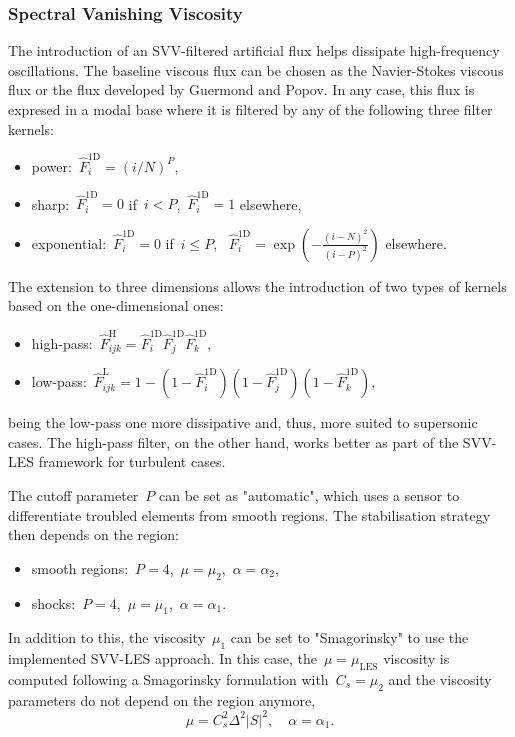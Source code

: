 \documentclass[a4paper,10pt]{report}
\begin{document}
\subsubsection{Spectral Vanishing Viscosity}

The introduction of an SVV-filtered artificial flux helps dissipate high-frequency oscillations. The baseline viscous flux can be chosen as the Navier-Stokes viscous flux or the flux developed by Guermond and Popov. In any case, this flux is expresed in a modal base where it is filtered by any of the following three filter kernels:
%
\begin{itemize}
    \item power:~$\hat{F}^{\text{1D}}_i = (i/N)^P$,
    \item sharp:~$\hat{F}^{\text{1D}}_i = 0$ if~$i<P$,~$\hat{F}^{\text{1D}}_i = 1$ elsewhere,
    \item exponential:~$\hat{F}^{\text{1D}}_i = 0$ if~$i \leq P$, ~$\hat{F}^{\text{1D}}_i=\exp\left(-\frac{(i-N)^2}{(i-P)^2}\right)$ elsewhere.
\end{itemize}
%
The extension to three dimensions allows the introduction of two types of kernels based on the one-dimensional ones:
%
\begin{itemize}
    \item high-pass:~$\hat{F}^{\text{H}}_{ijk} = \hat{F}^{\text{1D}}_i \hat{F}^{\text{1D}}_j \hat{F}^{\text{1D}}_k$,
    \item low-pass:~$\hat{F}^{\text{L}}_{ijk} = 1 - \left(1-\hat{F}^{\text{1D}}_i\right)\left(1-\hat{F}^{\text{1D}}_j\right)\left(1-\hat{F}^{\text{1D}}_k\right)$,
\end{itemize}
%
being the low-pass one more dissipative and, thus, more suited to supersonic cases. The high-pass filter, on the other hand, works better as part of the SVV-LES framework for turbulent cases.

The cutoff parameter~$P$ can be set as "automatic", which uses a sensor to differentiate troubled elements from smooth regions. The stabilisation strategy then depends on the region:
%
\begin{itemize}
    \item smooth regions:~$P=4$,~$\mu=\mu_2$,~$\alpha=\alpha_2$,
    \item shocks:~$P=4$,~$\mu=\mu_1$,~$\alpha=\alpha_1$.
\end{itemize}

In addition to this, the viscosity~$\mu_1$ can be set to "Smagorinsky" to use the implemented SVV-LES approach. In this case, the~$\mu=\mu_{\text{LES}}$ viscosity is computed following a Smagorinsky formulation with~$C_s=\mu_2$ and the viscosity parameters do not depend on the region anymore,
%
\begin{equation*}
    \mu = C_s^2 \Delta^2|S|^2, \quad \alpha = \alpha_1.
\end{equation*}
\end{document}
